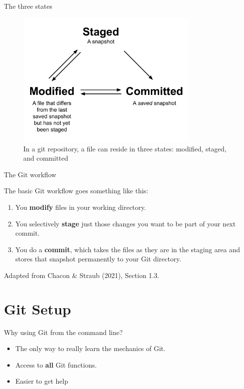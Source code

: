 \documentclass[handout]{beamer}
\begin{document}
\begin{frame}{The three states}
  \begin{figure}
	  \includegraphics[width=0.8\textwidth]{figures/git_states.pdf}
	  \caption{In a git repository, a file can reside in three states: modified, staged, and committed}
  \end{figure} 
\end{frame}

\begin{frame}{The Git workflow}
  \begin{exampleblock}{The basic Git workflow goes something like this:}
    \begin{enumerate}
      \item You \textbf{modify} files in your working directory.
      \item You selectively \textbf{stage} just those changes you want to be part of your next commit.
      \item You do a \textbf{commit}, which takes the files as they are in the staging area and stores that snapshot permanently to your Git directory.
    \end{enumerate}
  \end{exampleblock}
  {\scriptsize Adapted from Chacon \& Straub (2021), Section 1.3.}
\end{frame}

\section{Git Setup}

\begin{frame}{Why using Git from the command line?}
  \begin{itemize}
    \item The only way to really learn the mechanics of Git. 
    \item Access to \textbf{all} Git functions.
    \item Easier to get help
  \end{itemize}
\end{frame}
\end{document}
